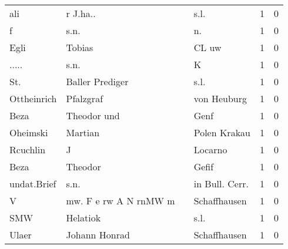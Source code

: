 \documentclass[10pt,a4paper,landscape]{article}
\begin{document}
\begin{longtable}{llllrr}
                      ali &                           r J.ha.. &             &                                        s.l. &          1 &         0 \\
                        f &                               s.n. &             &                                         n.  &          1 &         0 \\
                     Egli &                             Tobias &             &                                       CL uw &          1 &         0 \\
                    ..... &                               s.n. &             &                                           K &          1 &         0 \\
                      St. &                    Baller Prediger &             &                                        s.l. &          1 &         0 \\
              Ottheinrich &                          Pfalzgraf &             &                                 von Heuburg &          1 &         0 \\
                     Beza &                        Theodor und &             &                                        Genf &          1 &         0 \\
                 Oheimski &                            Martian &             &                                Polen Krakau &          1 &         0 \\
                 Rcuchlin &                                  J &             &                                     Locarno &          1 &         0 \\
                     Beza &                            Theodor &             &                                       Gefif &          1 &         0 \\
              undat.Brief &                               s.n. &             &                             in Bull. Cerr.  &          1 &         0 \\
                        V &              mw. F e rw A N rnMW m &             &                                Schaffhausen &          1 &         0 \\
                      SMW &                           Helatiok &             &                                        s.l. &          1 &         0 \\
                    Ulaer &                      Johann Honrad &             &                                Schaffhausen &          1 &         0 \\

\end{longtable}
\end{document}
